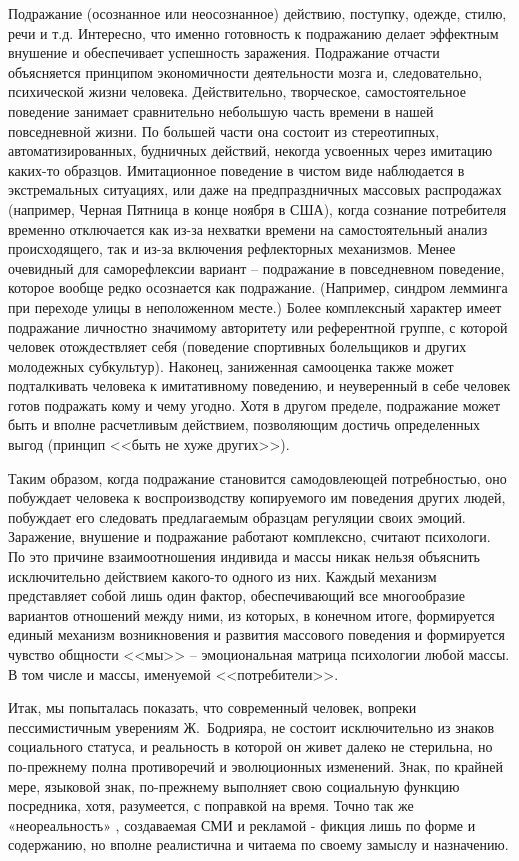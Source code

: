 Подражание (осознанное или неосознанное) действию, поступку, одежде, стилю,
речи и т.д. Интересно, что именно готовность к подражанию делает эффектным
внушение и обеспечивает успешность заражения.\autocite{pagel2012wired}\autocite{freid_mass}\autocite{porshnev1979}
Подражание отчасти объясняется принципом экономичности деятельности мозга и,
следовательно, психической жизни человека. Действительно, творческое, самостоятельное
поведение занимает сравнительно небольшую часть времени в нашей повседневной жизни.
По большей части она состоит из стереотипных, автоматизированных, будничных действий,
некогда усвоенных через имитацию каких-то образцов. Имитационное поведение в чистом
виде наблюдается в экстремальных ситуациях, или даже на предпраздничных массовых
распродажах (например, Черная Пятница в конце ноября в США), когда сознание
потребителя временно отключается как из-за нехватки времени на самостоятельный
анализ происходящего, так и из-за включения рефлекторных механизмов.
Менее очевидный для саморефлексии вариант -- подражание в повседневном поведение,
которое вообще редко осознается как подражание. (Например, синдром лемминга при
переходе улицы в неположенном месте.) Более комплексный характер имеет подражание
личностно значимому авторитету или референтной группе, с которой человек отождествляет
себя (поведение спортивных болельщиков и других молодежных субкультур).
Наконец, заниженная самооценка также может подталкивать человека к имитативному
поведению, и неуверенный в себе человек готов подражать кому и чему угодно.
Хотя в другом пределе, подражание может быть и вполне расчетливым действием,
позволяющим достичь определенных выгод (принцип <<быть не хуже других>>).

Таким образом, когда подражание становится самодовлеющей потребностью,
оно побуждает человека к воспроизводству копируемого им поведения других людей,
побуждает его следовать предлагаемым образцам регуляции своих эмоций. Заражение,
внушение и подражание работают комплексно, считают психологи. По это причине
взаимоотношения индивида и массы никак нельзя объяснить исключительно действием
какого-то одного из них. Каждый механизм представляет собой лишь один фактор,
обеспечивающий все многообразие вариантов отношений между ними, из которых, в
конечном итоге, формируется единый механизм возникновения и развития массового
поведения и формируется чувство общности <<мы>> -- эмоциональная матрица психологии
любой массы. В том числе и массы, именуемой <<потребители>>.

Итак, мы попыталась показать, что современный человек, вопреки пессимистичным
уверениям Ж.~Бодрияра, не состоит исключительно из знаков социального статуса, и
реальность в которой он живет далеко не стерильна, но по-прежнему полна противоречий
и эволюционных изменений. Знак, по крайней мере, языковой знак, по-прежнему выполняет
свою социальную функцию посредника, хотя, разумеется, с поправкой на время.
Точно так же «неореальность» , создаваемая СМИ и рекламой - фикция лишь по форме и
содержанию, но вполне реалистична и читаема по своему замыслу и назначению.

